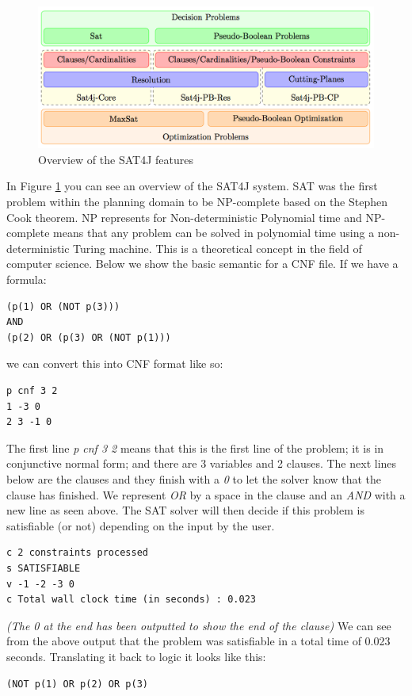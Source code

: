 \begin{figure}[!htb]
    \centering
    \includegraphics[scale=0.27]{SATFeaturesNew.png}
    \caption{Overview of the SAT4J features}
    \label{fig:SAT4J}
\end{figure}
In Figure \ref{fig:SAT4J} you can see an overview of the SAT4J system\cite{SATandSAT4J}. SAT was the first problem within the planning domain to be NP-complete based on the Stephen Cook theorem\cite{SteveCook}. NP represents for Non-deterministic Polynomial time and NP-complete means that any problem can be solved in polynomial time using a non-deterministic Turing machine. This is a theoretical concept in the field of computer science.
Below we show the basic semantic for a CNF file. 
If we have a formula:
\begin{verbatim}
(p(1) OR (NOT p(3)))
AND
(p(2) OR (p(3) OR (NOT p(1)))
\end{verbatim}
we can convert this into CNF format like so:
\begin{verbatim}
p cnf 3 2
1 -3 0
2 3 -1 0
\end{verbatim}
The first line \textit{p cnf 3 2} means that this is the first line of the problem; it is in conjunctive normal form; and there are 3 variables and 2 clauses. The next lines below are the clauses and they finish with a \textit{0} to let the solver know that the clause has finished. We represent \textit{OR} by a space in the clause and an \textit{AND} with a new line as seen above.
The SAT solver will then decide if this problem is satisfiable (or not) depending on the input by the user.
\begin{verbatim}
c 2 constraints processed
s SATISFIABLE
v -1 -2 -3 0
c Total wall clock time (in seconds) : 0.023 
\end{verbatim}
\textit{(The 0 at the end has been outputted to show the end of the clause)}
We can see from the above output that the problem was satisfiable in a total time of 0.023 seconds. Translating it back to logic it looks like this:
\begin{verbatim}
(NOT p(1) OR p(2) OR p(3)
\end{verbatim} 
